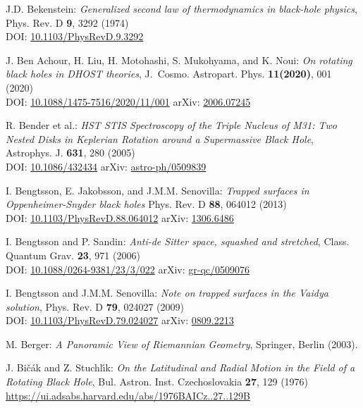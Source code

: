 \begin{thebibliography}{123}
J.D. Bekenstein:
{\em Generalized second law of thermodynamics in black-hole physics},
Phys. Rev. D {\bf 9}, 3292 (1974)\\
DOI: \href{https://doi.org/10.1103/PhysRevD.9.3292}{10.1103/PhysRevD.9.3292}

J. Ben Achour, H. Liu, H. Motohashi, S. Mukohyama, and K. Noui:
{\em On rotating black holes in DHOST theories},
J.~Cosmo. Astropart. Phys. {\bf 11(2020)}, 001 (2020)\\
DOI: \href{https://doi.org/10.1088/1475-7516/2020/11/001}{10.1088/1475-7516/2020/11/001}\hfill
arXiv: \href{https://arxiv.org/abs/2006.07245}{2006.07245}

R. Bender et al.:
{\em HST STIS Spectroscopy of the Triple Nucleus of M31: Two Nested Disks in Keplerian Rotation around a Supermassive Black Hole},
Astrophys. J. {\bf 631}, 280 (2005)\\
DOI: \href{https://doi.org/10.1086/432434}{10.1086/432434}\hfill
arXiv: \href{https://arxiv.org/abs/astro-ph/0509839}{astro-ph/0509839}

I. Bengtsson, E. Jakobsson, and J.M.M. Senovilla:
{\em Trapped surfaces in Oppenheimer-Snyder black holes}
Phys. Rev. D {\bf 88}, 064012 (2013)\\
DOI: \href{https://doi.org/10.1103/PhysRevD.88.064012}{10.1103/PhysRevD.88.064012}\hfill
arXiv: \href{https://arxiv.org/abs/1306.6486}{1306.6486}

I. Bengtsson and P. Sandin:
{\em Anti-de Sitter space, squashed and stretched},
Class. Quantum Grav. {\bf 23}, 971 (2006)\\
DOI: \href{https://doi.org/10.1088/0264-9381/23/3/022}{10.1088/0264-9381/23/3/022}\hfill
arXiv: \href{https://arxiv.org/abs/gr-qc/0509076}{gr-qc/0509076}

I. Bengtsson and J.M.M. Senovilla:
{\em Note on trapped surfaces in the Vaidya solution},
Phys. Rev. D {\bf 79}, 024027 (2009)\\
DOI: \href{https://doi.org/10.1103/PhysRevD.79.024027}{10.1103/PhysRevD.79.024027}\hfill
arXiv: \href{https://arxiv.org/abs/0809.2213}{0809.2213}

M. Berger: {\em A Panoramic View of Riemannian Geometry},
Springer, Berlin (2003).

J. Bi\v{c}\'{a}k and Z. Stuchl\'{\i}k:
{\em On the Latitudinal and Radial Motion in the Field of a Rotating Black Hole},
Bul. Astron. Inst. Czechoslovakia {\bf 27}, 129 (1976)\\
\url{https://ui.adsabs.harvard.edu/abs/1976BAICz..27..129B}


\end{thebibliography}
